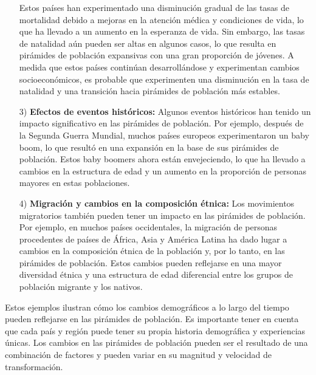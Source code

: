 \documentclass[8pt,a4paper]{beamer}
\begin{document}
{\begin{frame}{}
\begin{block}{}
\justifying

\begin{enumerate}
\justifying

\item[{}] Estos países han experimentado una disminución gradual de las tasas de mortalidad debido a mejoras en la atención médica y condiciones de vida, lo que ha llevado a un aumento en la esperanza de vida. Sin embargo, las tasas de natalidad aún pueden ser altas en algunos casos, lo que resulta en pirámides de población expansivas con una gran proporción de jóvenes. A medida que estos países continúan desarrollándose y experimentan cambios socioeconómicos, es probable que experimenten una disminución en la tasa de natalidad y una transición hacia pirámides de población más estables.
\item[3)] \textbf{Efectos de eventos históricos:} Algunos eventos históricos han tenido un impacto significativo en las pirámides de población. Por ejemplo, después de la Segunda Guerra Mundial, muchos países europeos experimentaron un baby boom, lo que resultó en una expansión en la base de sus pirámides de población. Estos baby boomers ahora están envejeciendo, lo que ha llevado a cambios en la estructura de edad y un aumento en la proporción de personas mayores en estas poblaciones.

\item[4)] \textbf{Migración y cambios en la composición étnica:} Los movimientos migratorios también pueden tener un impacto en las pirámides de población. Por ejemplo, en muchos países occidentales, la migración de personas procedentes de países de África, Asia y América Latina ha dado lugar a cambios en la composición étnica de la población y, por lo tanto, en las pirámides de población. Estos cambios pueden reflejarse en una mayor diversidad étnica y una estructura de edad diferencial entre los grupos de población migrante y los nativos.
\end{enumerate}
\end{block}
\end{frame}


\begin{frame}{}
\begin{block}{}
\justifying
Estos ejemplos ilustran cómo los cambios demográficos a lo largo del tiempo pueden reflejarse en las pirámides de población. Es importante tener en cuenta que cada país y región puede tener su propia historia demográfica y experiencias únicas. Los cambios en las pirámides de población pueden ser el resultado de una combinación de factores y pueden variar en su magnitud y velocidad de transformación.


\end{block}
\end{frame}}
\end{document}

